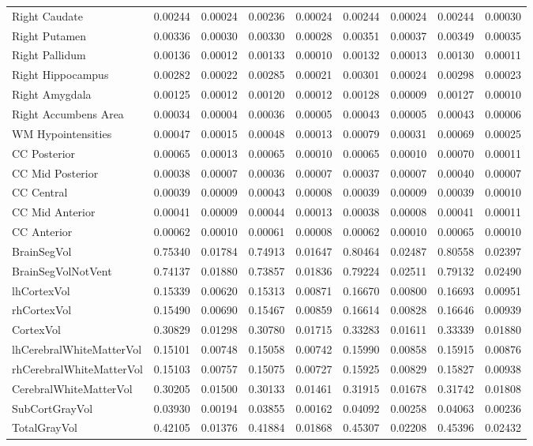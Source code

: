 \documentclass[diagnostics,article,accept,pdftex,moreauthors]{Definitions/mdpi}
\begin{document}
\begin{table}[H]
\begin{tabular}{lcccccccc}
Right Caudate & 0.00244 & 0.00024 & 0.00236 & 0.00024 & 0.00244 & 0.00024 & 0.00244 & 0.00030 \\
Right Putamen & 0.00336 & 0.00030 & 0.00330 & 0.00028 & 0.00351 & 0.00037 & 0.00349 & 0.00035 \\
Right Pallidum & 0.00136 & 0.00012 & 0.00133 & 0.00010 & 0.00132 & 0.00013 & 0.00130 & 0.00011 \\
Right Hippocampus & 0.00282 & 0.00022 & 0.00285 & 0.00021 & 0.00301 & 0.00024 & 0.00298 & 0.00023 \\
Right Amygdala & 0.00125 & 0.00012 & 0.00120 & 0.00012 & 0.00128 & 0.00009 & 0.00127 & 0.00010 \\
Right Accumbens Area & 0.00034 & 0.00004 & 0.00036 & 0.00005 & 0.00043 & 0.00005 & 0.00043 & 0.00006 \\
WM Hypointensities & 0.00047 & 0.00015 & 0.00048 & 0.00013 & 0.00079 & 0.00031 & 0.00069 & 0.00025 \\
CC Posterior & 0.00065 & 0.00013 & 0.00065 & 0.00010 & 0.00065 & 0.00010 & 0.00070 & 0.00011 \\
CC Mid Posterior & 0.00038 & 0.00007 & 0.00036 & 0.00007 & 0.00037 & 0.00007 & 0.00040 & 0.00007 \\
CC Central & 0.00039 & 0.00009 & 0.00043 & 0.00008 & 0.00039 & 0.00009 & 0.00039 & 0.00010 \\
CC Mid Anterior & 0.00041 & 0.00009 & 0.00044 & 0.00013 & 0.00038 & 0.00008 & 0.00041 & 0.00011 \\
CC Anterior & 0.00062 & 0.00010 & 0.00061 & 0.00008 & 0.00062 & 0.00010 & 0.00065 & 0.00010 \\
BrainSegVol & 0.75340 & 0.01784 & 0.74913 & 0.01647 & 0.80464 & 0.02487 & 0.80558 & 0.02397 \\
BrainSegVolNotVent & 0.74137 & 0.01880 & 0.73857 & 0.01836 & 0.79224 & 0.02511 & 0.79132 & 0.02490 \\
lhCortexVol & 0.15339 & 0.00620 & 0.15313 & 0.00871 & 0.16670 & 0.00800 & 0.16693 & 0.00951 \\
rhCortexVol & 0.15490 & 0.00690 & 0.15467 & 0.00859 & 0.16614 & 0.00828 & 0.16646 & 0.00939 \\
CortexVol & 0.30829 & 0.01298 & 0.30780 & 0.01715 & 0.33283 & 0.01611 & 0.33339 & 0.01880 \\
lhCerebralWhiteMatterVol & 0.15101 & 0.00748 & 0.15058 & 0.00742 & 0.15990 & 0.00858 & 0.15915 & 0.00876 \\
rhCerebralWhiteMatterVol & 0.15103 & 0.00757 & 0.15075 & 0.00727 & 0.15925 & 0.00829 & 0.15827 & 0.00938 \\
CerebralWhiteMatterVol & 0.30205 & 0.01500 & 0.30133 & 0.01461 & 0.31915 & 0.01678 & 0.31742 & 0.01808 \\
SubCortGrayVol & 0.03930 & 0.00194 & 0.03855 & 0.00162 & 0.04092 & 0.00258 & 0.04063 & 0.00236 \\
TotalGrayVol & 0.42105 & 0.01376 & 0.41884 & 0.01868 & 0.45307 & 0.02208 & 0.45396 & 0.02432 \\
\hline




\end{tabular}
\end{table}
\end{document}

